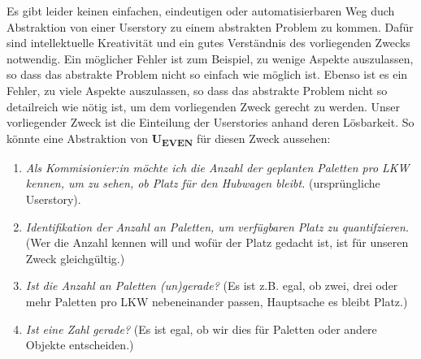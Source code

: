 Es gibt leider keinen einfachen, eindeutigen oder automatisierbaren Weg
duch Abstraktion von einer Userstory zu einem abstrakten Problem zu kommen.
Dafür sind intellektuelle Kreativität
und ein gutes Verständnis des vorliegenden Zwecks notwendig.
Ein möglicher Fehler ist zum Beispiel,
zu wenige Aspekte auszulassen,
so dass das abstrakte Problem nicht so einfach wie möglich ist.
Ebenso ist es ein Fehler, zu viele Aspekte auszulassen,
so dass das abstrakte Problem nicht so detailreich wie nötig ist,
um dem vorliegenden Zweck gerecht zu werden.
Unser vorliegender Zweck ist die Einteilung der Userstories anhand deren Lösbarkeit.
So könnte eine Abstraktion von \textbf{U\textsubscript{EVEN}} für diesen Zweck aussehen:
\begin{enumerate}
    \item \emph{Als Kommisionier:in
         möchte ich die Anzahl der geplanten Paletten pro LKW kennen,
         um zu sehen, ob Platz für den Hubwagen bleibt.
        } (ursprüngliche Userstory).
    \item \emph{Identifikation der Anzahl an Paletten, um verfügbaren Platz zu quantifzieren.}
        (Wer die Anzahl kennen will und wofür der Platz gedacht ist,
        ist für unseren Zweck gleichgültig.)
    \item \emph{Ist die Anzahl an Paletten (un)gerade?}
        (Es ist z.B. egal,
        ob zwei, drei oder mehr Paletten pro LKW nebeneinander passen,
        Hauptsache es bleibt Platz.)
    \item \emph{Ist eine Zahl gerade?}
        (Es ist egal, ob wir dies für Paletten oder andere Objekte entscheiden.)
\end{enumerate}

